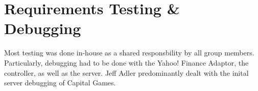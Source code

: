 \chapter{Requirements Testing \& Debugging}

Most testing was done in-house as a shared responsbility by all group members. Particularly, debugging had to be done with the Yahoo! Finance Adaptor, the controller, as well as the server. Jeff Adler predominantly dealt with the inital server debugging of Capital Games. 

